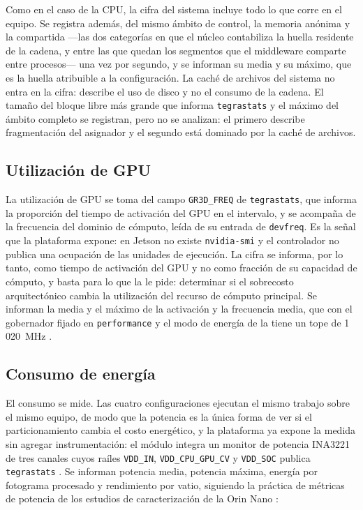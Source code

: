 Como en el caso de la CPU, la cifra del sistema incluye todo lo que corre en
el equipo. Se registra además, del mismo ámbito de control, la memoria anónima
y la compartida ---las dos categorías en que el núcleo contabiliza la huella
residente de la cadena, y entre las que quedan los segmentos que el middleware
comparte entre procesos--- una vez por segundo, y se informan su media y su
máximo, que es la huella atribuible a la configuración. La caché de archivos
del sistema no entra en la cifra: describe el uso de disco y no el consumo de
la cadena. El tamaño del bloque libre más grande que informa
\texttt{tegrastats} y el máximo del ámbito completo se registran, pero no se
analizan: el primero describe fragmentación del asignador y el segundo está
dominado por la caché de archivos.

\subsection{Utilización de GPU}

La utilización de GPU se toma del campo \texttt{GR3D\_FREQ} de
\texttt{tegrastats}, que informa la proporción del tiempo de activación del
GPU en el intervalo, y se acompaña de la frecuencia del dominio de cómputo,
leída de su entrada de \texttt{devfreq}. Es la señal que la plataforma expone:
en Jetson no existe \texttt{nvidia-smi} y el controlador no publica una
ocupación de las unidades de ejecución. La cifra se informa, por lo tanto,
como tiempo de activación del GPU y no como fracción de su capacidad de
cómputo, y basta para lo que la  le pide: determinar si el
sobrecosto arquitectónico cambia la utilización del recurso de cómputo
principal. Se informan la media y el máximo de la activación y la frecuencia
media, que con el gobernador fijado en \texttt{performance} y el modo de
energía de la  tiene un tope de 1\,020~MHz
\cite{nvidiacorporation2026potencia}.

\subsection{Consumo de energía}
\label{sec:power}

El consumo se mide. Las cuatro configuraciones ejecutan el mismo trabajo sobre
el mismo equipo, de modo que la potencia es la única forma de ver si el
particionamiento cambia el costo energético, y la plataforma ya expone la
medida sin agregar instrumentación: el módulo integra un monitor de potencia
INA3221 de tres canales cuyos raíles \texttt{VDD\_IN}, \texttt{VDD\_CPU\_GPU\_CV}
y \texttt{VDD\_SOC} publica \texttt{tegrastats}
\cite{nvidiacorporation2026potencia, nvidiacorporation2026tegrastats}. Se
informan potencia media, potencia máxima, energía por fotograma procesado y
rendimiento por vatio, siguiendo la práctica de métricas de potencia de los
estudios de caracterización de la Orin Nano \cite{tang2026}:

